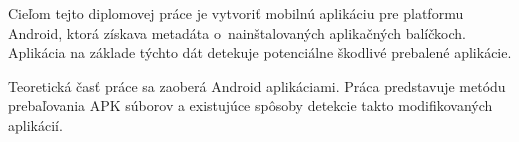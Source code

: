 Cieľom tejto diplomovej práce je vytvoriť mobilnú aplikáciu pre platformu Android, ktorá získava metadáta o~nainštalovaných aplikačných balíčkoch. Aplikácia na základe týchto dát detekuje potenciálne škodlivé prebalené aplikácie. 

\noindent Teoretická časť práce sa zaoberá Android aplikáciami. Práca predstavuje metódu prebaľovania APK súborov a existujúce spôsoby detekcie takto modifikovaných aplikácií.


